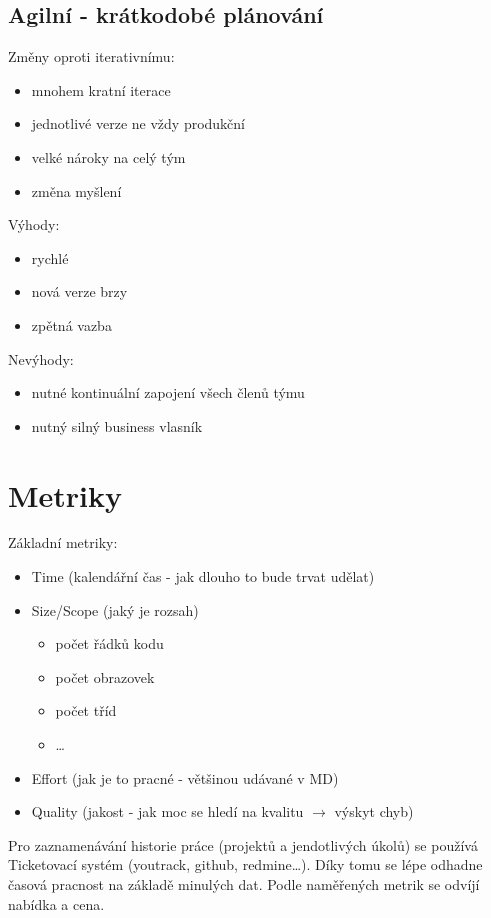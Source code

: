 \documentclass{szzclass}
\begin{document}
\subsection{Agilní - krátkodobé plánování}
Změny oproti iterativnímu:
\begin{itemize}
    \item mnohem kratní iterace
    \item jednotlivé verze ne vždy produkční
    \item velké nároky na celý tým
    \item změna myšlení
\end{itemize}
Výhody:
\begin{itemize}
    \item rychlé
    \item nová verze brzy
    \item zpětná vazba
\end{itemize}
Nevýhody:
\begin{itemize}
    \item nutné kontinuální zapojení všech členů týmu
    \item nutný silný business vlasník
\end{itemize}
\section{Metriky}
Základní metriky:
\begin{itemize}
    \item Time (kalendářní čas - jak dlouho to bude trvat udělat)
    \item Size/Scope (jaký je rozsah)
    \begin{itemize}
        \item počet řádků kodu
        \item počet obrazovek
        \item počet tříd
        \item \dots
    \end{itemize}
    \item Effort (jak je to pracné - většinou udávané v MD)
    \item Quality (jakost - jak moc se hledí na kvalitu $\rightarrow$ výskyt chyb)
\end{itemize}
Pro zaznamenávání historie práce (projektů a jendotlivých úkolů) se používá Ticketovací systém (youtrack, github, redmine\dots).
Díky tomu se lépe odhadne časová pracnost na základě minulých dat. Podle naměřených metrik se odvíjí nabídka a cena.
\end{document}
